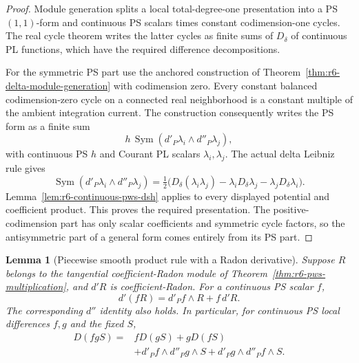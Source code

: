 \documentclass[11pt,a4paper]{article}
\numberwithin{equation}{section}
\newtheorem{lemma}[theorem]{Lemma}
\theoremstyle{definition}
\theoremstyle{remark}
\begin{document}
\begin{proof}
Module generation splits a local total-degree-one presentation into
a PS $(1,1)$-form and continuous PS scalars times constant
codimension-one cycles.  The real cycle theorem writes the latter
cycles as finite sums of $D_\delta$ of continuous PL functions,
which have the required difference decompositions.

For the symmetric PS part use the anchored construction of
Theorem~\ref{thm:r6-delta-module-generation} with codimension zero.
Every constant balanced codimension-zero cycle on a connected real
neighborhood is a constant multiple of the ambient integration
current.  The construction consequently writes the PS form as a
finite sum
\[
                   h\,\operatorname{Sym}
                         (d'_P\lambda_i\wedge d''_P\lambda_j),
\]
with continuous PS $h$ and Courant PL scalars $\lambda_i,\lambda_j$.
The actual delta Leibniz rule gives
\[
 \operatorname{Sym}(d'_P\lambda_i\wedge d''_P\lambda_j)
   =\tfrac12\bigl(D_\delta(\lambda_i\lambda_j)
                 -\lambda_iD_\delta\lambda_j
                 -\lambda_jD_\delta\lambda_i\bigr).
\]
Lemma~\ref{lem:r6-continuous-pws-dsh} applies to every displayed
potential and coefficient product.  This proves the required
presentation.  The positive-codimension part has only scalar
coefficients and symmetric cycle factors, so the antisymmetric
part of a general form comes entirely from its PS part.
\end{proof}

\begin{lemma}[Piecewise smooth product rule with a Radon derivative]
\label{lem:r6-pws-radon-leibniz}
Suppose $R$ belongs to the tangential coefficient-Radon module of
Theorem~\ref{thm:r6-pws-multiplication}, and $d'R$ is coefficient-Radon.
For a continuous PS scalar $f$,
\[
                   d'(fR)=d'_Pf\wedge R+f\,d'R.
\]
The corresponding $d''$ identity also holds.  In particular, for
continuous PS local differences $f,g$ and the fixed $S$,
\begin{align*}
 D(fgS)={}&fD(gS)+gD(fS)\\
         &+d'_Pf\wedge d''_Pg\wedge S
          +d'_Pg\wedge d''_Pf\wedge S.
\end{align*}
\end{lemma}
\end{document}
